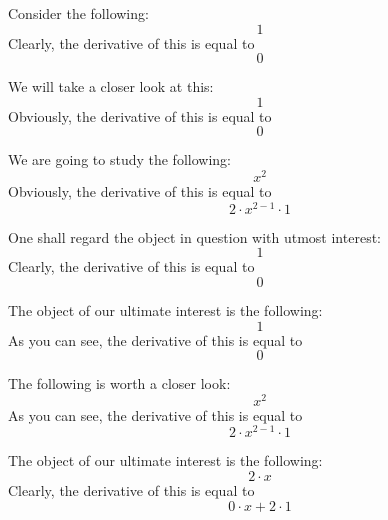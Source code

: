 \documentclass{article}
\begin{document}
Consider the following:
\begin{equation}
1 
\end{equation}
Clearly, the derivative of this is equal to
\begin{equation}
0 
\end{equation}

We will take a closer look at this:
\begin{equation}
1 
\end{equation}
Obviously, the derivative of this is equal to
\begin{equation}
0 
\end{equation}

We are going to study the following:
\begin{equation}
x ^{2 } 
\end{equation}
Obviously, the derivative of this is equal to
\begin{equation}
2 \cdot x ^{2 - 1 } \cdot 1 
\end{equation}

One shall regard the object in question with utmost interest:
\begin{equation}
1 
\end{equation}
Clearly, the derivative of this is equal to
\begin{equation}
0 
\end{equation}

The object of our ultimate interest is the following:
\begin{equation}
1 
\end{equation}
As you can see, the derivative of this is equal to
\begin{equation}
0 
\end{equation}

The following is worth a closer look:
\begin{equation}
x ^{2 } 
\end{equation}
As you can see, the derivative of this is equal to
\begin{equation}
2 \cdot x ^{2 - 1 } \cdot 1 
\end{equation}

The object of our ultimate interest is the following:
\begin{equation}
2 \cdot x 
\end{equation}
Clearly, the derivative of this is equal to
\begin{equation}
0 \cdot x + 2 \cdot 1 
\end{equation}
\end{document}
